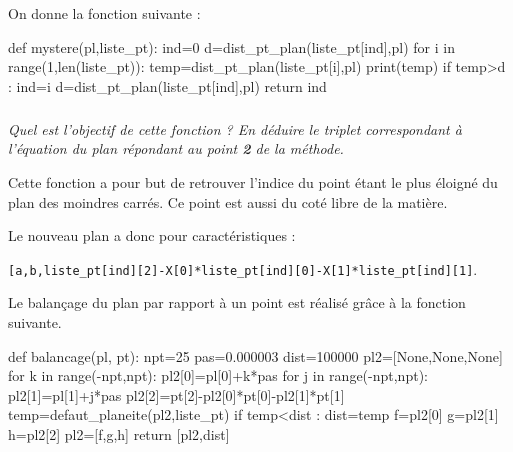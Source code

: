 \documentclass[10pt,fleqn]{article} %
\begin{document}
\newpage 

On donne la fonction suivante :

\begin{py}
\begin{python}
def mystere(pl,liste_pt):
    ind=0
    d=dist_pt_plan(liste_pt[ind],pl)
    for i in range(1,len(liste_pt)):
        temp=dist_pt_plan(liste_pt[i],pl)
        print(temp)
        if temp>d :
            ind=i
            d=dist_pt_plan(liste_pt[ind],pl)
    return ind
\end{python}
\end{py}

\fi 

\subparagraph{}
\textit{Quel est l'objectif de cette fonction ? En déduire le triplet correspondant à l'équation du plan répondant au point \textbf{2} de la méthode. }
\ifprof
\begin{corrige}
Cette fonction a pour but de retrouver l'indice du point étant le plus éloigné du plan des moindres carrés. Ce point est aussi du coté libre de la matière.

Le nouveau plan a donc pour caractéristiques : 

\texttt{[a,b,liste\_pt[ind][2]-X[0]*liste\_pt[ind][0]-X[1]*liste\_pt[ind][1]}.
\end{corrige}
\else
\fi

\ifprof
\else
Le balançage du plan par rapport à un point est réalisé grâce à la fonction suivante. 

\begin{py}
\begin{python}
def balancage(pl, pt):
    npt=25
    pas=0.000003
    dist=100000
    pl2=[None,None,None]
    for k in range(-npt,npt):
        pl2[0]=pl[0]+k*pas
        for j in range(-npt,npt):
            pl2[1]=pl[1]+j*pas
            pl2[2]=pt[2]-pl2[0]*pt[0]-pl2[1]*pt[1]
            temp=defaut_planeite(pl2,liste_pt)	
            if temp<dist :
                dist=temp
                f=pl2[0]
                g=pl2[1]
                h=pl2[2]
    pl2=[f,g,h]    
    return [pl2,dist]	
\end{python}
\end{py}

\fi
\end{document}
